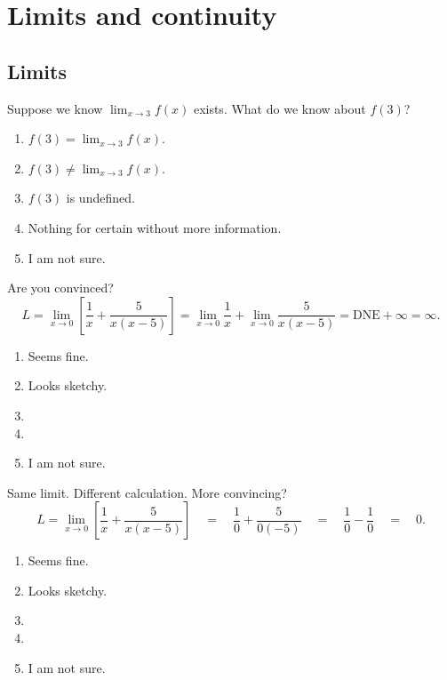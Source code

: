 \documentclass[aspectratio=169, 14pt, t]{beamer}  %
\begin{document}
\section{Limits and continuity}

\subsection{Limits}

\begin{poll}
  Suppose we know \(\lim_{x \to 3} f(x)\) exists. What do we know about \(f(3)\)?

  \begin{enumerate}
    \item \(f(3)  =  \lim_{x \to 3} f(x)\).
    \item \(f(3) \ne \lim_{x \to 3} f(x)\).
    \item \(f(3)\) is undefined.
    \item Nothing for certain without more information.
    \item I am not sure.
  \end{enumerate}
\end{poll}

\begin{poll}
  Are you convinced?
  \[
    L = \lim_{x \to 0} \left[ \frac{1}{x} + \frac{5}{x(x-5)} \right] = \lim_{x \to 0} \frac{1}{x} + \lim_{x \to 0} \frac{5}{x(x-5)} = \text{DNE} + \infty = \infty.
  \]

  \begin{enumerate}
    \item Seems fine.
    \item Looks sketchy.
    \item
    \item
    \item I am not sure.
  \end{enumerate}
\end{poll}

\begin{poll}

  Same limit. Different calculation. More convincing?
  \[
    L = \lim_{x \to 0} \left[ \frac{1}{x} + \frac{5}{x(x-5)} \right] \quad=\quad \frac{1}{0} + \frac{5}{0(-5)} \quad=\quad \frac{1}{0} - \frac{1}{0} \quad=\quad 0.
  \]

  \begin{minipage}{.5\textwidth}
    \begin{enumerate}
      \item Seems fine.
      \item Looks sketchy.
      \item
      \item
      \item I am not sure.
    \end{enumerate}
  \end{minipage}
  \begin{minipage}{.4\textwidth}
    \pause
    \huge
  \end{minipage}
\end{poll}
\end{document}
